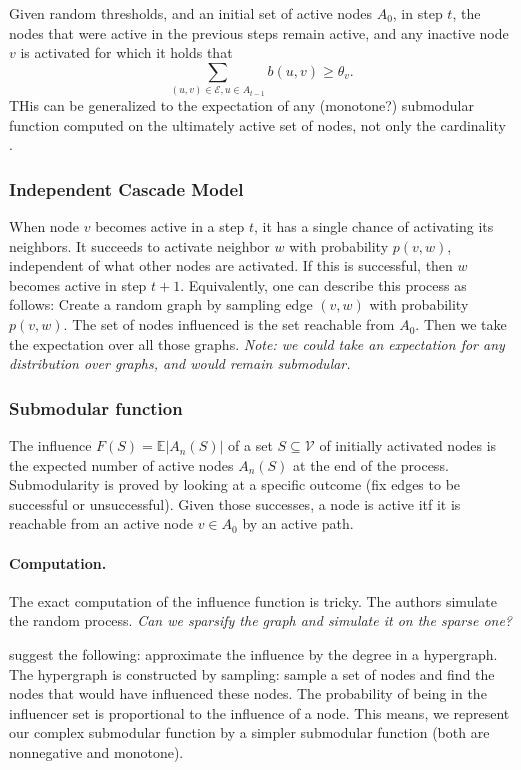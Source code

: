 \documentclass{article}
\newcommand{\Es}{\mathcal{E}}
\newcommand{\Vs}{\mathcal{V}}
\begin{document}
Given random thresholds, and an initial set of active nodes $A_0$, in step $t$, the nodes that were active in the previous steps remain active, and any inactive node $v$ is activated for which it holds that
\begin{equation*}
  \sum_{(u,v) \in \Es, u \in A_{t-1}} b(u,v) \geq \theta_v.
\end{equation*}
THis can be generalized to the expectation of any (monotone?) submodular function computed on the ultimately active set of nodes, not only the cardinality \cite{mossel07}.

\subsubsection{Independent Cascade Model}
When node $v$ becomes active in a step $t$, it has a single chance of activating its neighbors. It succeeds to activate neighbor $w$ with probability $p(v,w)$, independent of what other nodes are activated. If this is successful, then $w$ becomes active in step $t+1$. 
Equivalently, one can describe this process as follows: Create a random graph by sampling edge $(v,w)$ with probability $p(v,w)$. The set of nodes influenced is the set reachable from $A_0$. Then we take the expectation over all those graphs. \emph{Note: we could take an expectation for any distribution over graphs, and would remain submodular.}

\subsubsection{Submodular function}
The influence $F(S) = \mathbb{E}|A_n(S)|$ of a set $S \subseteq \Vs$ of initially activated nodes is the expected number of active nodes $A_n(S)$ at the end of the process. Submodularity is proved by looking at a specific outcome (fix edges to be successful or unsuccessful). Given those successes, a node is active itf it is reachable from an active node $v \in A_0$ by an active path.

\paragraph{Computation.} The exact computation of the influence function is tricky. The authors simulate the random process.
\emph{Can we sparsify the graph and simulate it on the sparse one?}

\citet{borgs13} suggest the following: approximate the influence by the degree in a hypergraph. The hypergraph is constructed by sampling: sample a set of nodes and find the nodes that would have influenced these nodes. The probability of being in the influencer set is proportional to the influence of a node. This means, we represent our complex submodular function by a simpler submodular function (both are nonnegative and monotone).




\end{document}
